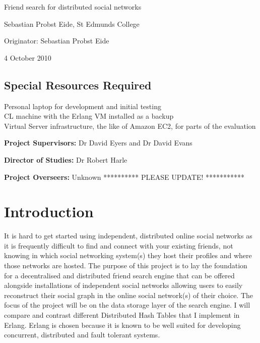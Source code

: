 

\vfil

\centerline{\Large Friend search for distributed social networks }
\vspace{0.4in}
\centerline{\large Sebastian Probst Eide, St Edmunds College }
\vspace{0.3in}
\centerline{\large Originator: Sebastian Probst Eide}
\vspace{0.3in}
\centerline{\large 4 October 2010}

\vfil

\subsection*{Special Resources Required}
Personal laptop for development and initial testing \\
CL machine with the Erlang VM installed as a backup \\
Virtual Server infrastructure, the like of Amazon EC2, for parts of the evaluation \\
\vspace{0.2in}

\noindent
{\bf Project Supervisors:} Dr David Eyers and Dr David Evans
\vspace{0.2in}

\noindent
{\bf Director of Studies:} Dr Robert Harle
\vspace{0.2in}
\noindent
 
\noindent
{\bf Project Overseers:} Unknown ********** PLEASE UPDATE! ***********

\vfil
\pagebreak


\section*{Introduction}

It is hard to get started using independent, distributed online social networks as it is frequently difficult to find and connect with your existing friends, not knowing in which social networking system(s) they host their profiles and where those networks are hosted. The purpose of this project is to lay the foundation for a decentralised and distributed friend search engine that can be offered alongside installations of independent social networks allowing users to easily reconstruct their social graph in the online social network(s) of their choice. The focus of the project will be on the data storage layer of the search engine. I will compare and contrast different Distributed Hash Tables that I implement in Erlang. Erlang is chosen because it is known to be well suited for developing concurrent, distributed and fault tolerant systems.

